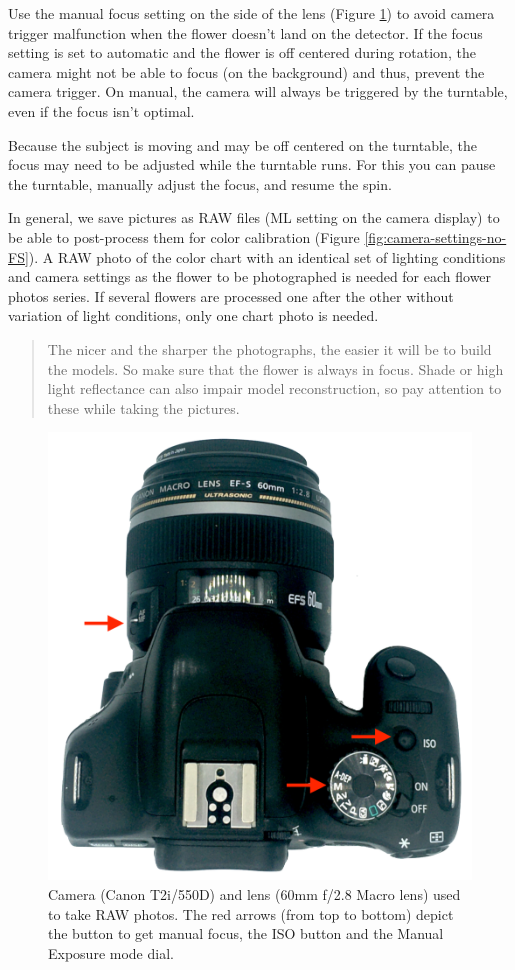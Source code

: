 \documentclass[
]{book}
\begin{document}
Use the manual focus setting on the side of the lens (Figure \ref{fig:camera-arrows-no-FS}) to avoid camera trigger malfunction when the flower doesn't land on the detector. If the focus setting is set to automatic and the flower is off centered during rotation, the camera might not be able to focus (on the background) and thus, prevent the camera trigger. On manual, the camera will always be triggered by the turntable, even if the focus isn't optimal.

Because the subject is moving and may be off centered on the turntable, the focus may need to be adjusted while the turntable runs. For this you can pause the turntable, manually adjust the focus, and resume the spin.

In general, we save pictures as RAW files (ML setting on the camera display) to be able to post-process them
for color calibration (Figure \ref{fig:camera-settings-no-FS}). A RAW photo of the color chart with an identical set of lighting conditions and camera settings as the flower to be photographed is needed for each flower photos series. If several flowers are processed one after the other without variation of light conditions, only one chart photo is needed.

\begin{quote}
The nicer and the sharper the photographs, the easier it will be to
build the models. So make sure that the flower is always in focus. Shade
or high light reflectance can also impair model reconstruction, so pay
attention to these while taking the pictures.
\end{quote}

\begin{figure}

{\centering \includegraphics[width=0.33\linewidth]{Figures/camera_arrows} 

}

\caption{Camera (Canon T2i/550D) and lens (60mm f/2.8 Macro lens) used to take RAW photos. The red arrows (from top to bottom) depict the button to get manual focus, the ISO button and the Manual Exposure mode dial.}\label{fig:camera-arrows-no-FS}
\end{figure}
\end{document}
